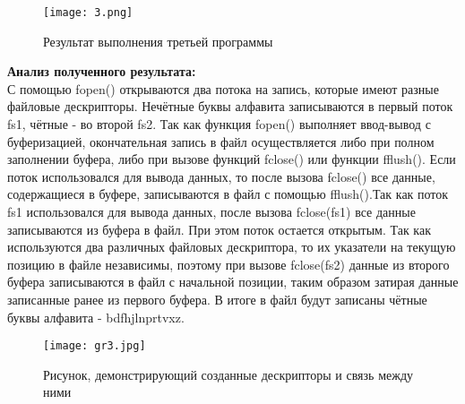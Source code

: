 \documentclass[a4paper,12pt]{article}
\begin{document}
\begin{figure}[th]
\texttt{[image: 3.png]}
\caption{Результат выполнения третьей программы}
\label{ris:third}
\end{figure}
\textbf {Анализ полученного результата:}\\

С помощью fopen() открываются два потока на запись, которые имеют разные файловые дескрипторы. Нечётные буквы алфавита записываются в первый поток fs1, чётные - во второй fs2. Так как функция fopen() выполняет ввод-вывод с буферизацией, окончательная запись в файл осуществляется либо при полном заполнении буфера, либо при вызове функций fclose() или функции fflush(). Если поток использовался для вывода данных, то после вызова fclose() все данные, содержащиеся в буфере, записываются в файл с помощью fflush().Так как поток fs1 использовался для вывода данных, после вызова fclose(fs1) все данные записываются из буфера в файл. При этом поток остается открытым. Так как используются два различных файловых дескриптора, то их указатели на текущую позицию в файле независимы, поэтому при вызове fclose(fs2) данные из второго буфера записываются в файл с начальной позиции, таким образом затирая данные записанные ранее из первого буфера. В итоге в файл будут записаны чётные буквы алфавита - bdfhjlnprtvxz.
\\

\begin{figure}[th]
\texttt{[image: gr3.jpg]}
\caption{Рисунок, демонстрирующий созданные дескрипторы и связь между ними}
\label{ris:gr3}
\end{figure}

\newpage
\end{document}
